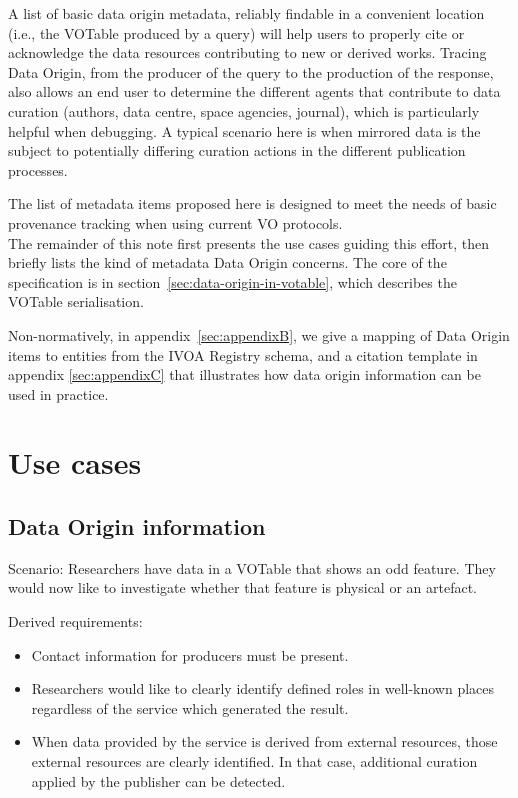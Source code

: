 \documentclass[11pt,a4paper]{ivoa}
\begin{document}
A list of basic data origin metadata, reliably findable in a convenient location (i.e.,
the VOTable produced by a query) will help users to properly cite or
acknowledge the data resources contributing to new or derived works.
Tracing Data Origin, from the producer of the query to the production of the response, also allows an end user to determine the different agents that contribute to data curation (authors, data centre, space agencies, journal), which is particularly helpful when debugging.  A typical scenario here is when mirrored data is the subject to potentially differing curation actions in the different publication processes.

The list of metadata items proposed here is designed to meet the needs of basic provenance
tracking when using current VO protocols.\\


The remainder of this note first presents the use cases guiding this
effort, then briefly lists the kind of metadata Data Origin concerns.
The core of the specification is in
section~\ref{sec:data-origin-in-votable}, which
describes the VOTable serialisation.

Non-normatively, in appendix~\ref{sec:appendixB}, we give a mapping of Data Origin items to entities from the IVOA Registry schema, and a citation template in appendix \ref{sec:appendixC}
that illustrates how data origin information can be used in practice.



\section{Use cases}

\subsection{Data Origin information}

Scenario: Researchers have data in a VOTable that shows an odd feature. They would now like to investigate whether that feature is physical or an artefact.

Derived requirements:

\begin{itemize}
\item Contact information for producers must be present.

\item Researchers would like to clearly identify defined roles in well-known places regardless of the service which generated the result.

\item When data provided by the service is derived from external resources, those external resources are clearly identified.  In that case, additional curation applied by the publisher can be detected.
\end{itemize}
\end{document}

